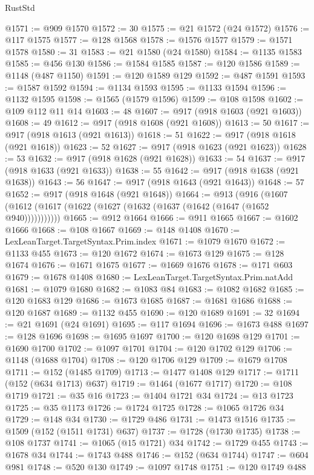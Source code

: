 \begin{lexlean}{RustStd}
\begin{coremodule}
@1571 := @909 @1570
@1572 := 30
@1575 := @21 @1572 (@24 @1572)
@1576 := @117 @1575
@1577 := @128 @1568
@1578 := @1576 @1577
@1579 := @1571 @1578
@1580 := 31
@1583 := @21 @1580 (@24 @1580)
@1584 := @1135 @1583
@1585 := @456 @130
@1586 := @1584 @1585
@1587 := @120 @1586
@1589 := @1148 (@487 @1150)
@1591 := @120 @1589 @129
@1592 := @487 @1591
@1593 := @1587 @1592
@1594 := @1134 @1593
@1595 := @1133 @1594
@1596 := @1132 @1595
@1598 := @1565 (@1579 @1596)
@1599 := @108 @1598
@1602 := @109 @112 @11 @14
@1603 := 48
@1607 := @917 (@918 @1603 (@921 @1603))
@1608 := 49
@1612 := @917 (@918 @1608 (@921 @1608))
@1613 := 50
@1617 := @917 (@918 @1613 (@921 @1613))
@1618 := 51
@1622 := @917 (@918 @1618 (@921 @1618))
@1623 := 52
@1627 := @917 (@918 @1623 (@921 @1623))
@1628 := 53
@1632 := @917 (@918 @1628 (@921 @1628))
@1633 := 54
@1637 := @917 (@918 @1633 (@921 @1633))
@1638 := 55
@1642 := @917 (@918 @1638 (@921 @1638))
@1643 := 56
@1647 := @917 (@918 @1643 (@921 @1643))
@1648 := 57
@1652 := @917 (@918 @1648 (@921 @1648))
@1664 := @913
    (@916 (@1607 (@1612 (@1617 (@1622 (@1627 (@1632 (@1637 (@1642 (@1647 (@1652 @940)))))))))))
@1665 := @912 @1664
@1666 := @911 @1665
@1667 := @1602 @1666
@1668 := @108 @1667
@1669 := @148 @1408
@1670 := LexLeanTarget.TargetSyntax.Prim.index
@1671 := @1079 @1670
@1672 := @1133 @455
@1673 := @120 @1672
@1674 := @1673 @129
@1675 := @128 @1674
@1676 := @1671 @1675
@1677 := @1669 @1676
@1678 := @171 @603
@1679 := @1678 @1408
@1680 := LexLeanTarget.TargetSyntax.Prim.natAdd
@1681 := @1079 @1680
@1682 := @1083 @84
@1683 := @1082 @1682
@1685 := @120 @1683 @129
@1686 := @1673 @1685
@1687 := @1681 @1686
@1688 := @120 @1687
@1689 := @1132 @455
@1690 := @120 @1689
@1691 := 32
@1694 := @21 @1691 (@24 @1691)
@1695 := @117 @1694
@1696 := @1673 @488
@1697 := @128 @1696
@1698 := @1695 @1697
@1700 := @120 @1698 @129
@1701 := @1690 @1700
@1702 := @1097 @1701
@1704 := @120 @1702 @129
@1706 := @1148 (@1688 @1704)
@1708 := @120 @1706 @129
@1709 := @1679 @1708
@1711 := @152 (@1485 @1709)
@1713 := @1477 @1408 @129
@1717 := @1711 (@152 (@634 @1713) @637)
@1719 := @1464 (@1677 @1717)
@1720 := @108 @1719
@1721 := @35 @16
@1723 := @1404 @1721 @34
@1724 := @13 @1723
@1725 := @35 @1173
@1726 := @1724 @1725
@1728 := @1065 @1726 @34
@1729 := @148 @34
@1730 := @1729 @486
@1731 := @1473 @1516
@1735 := @1509 (@152 (@1511 @1731) @637)
@1737 := @1728 (@1730 @1735)
@1738 := @108 @1737
@1741 := @1065 (@15 @1721) @34
@1742 := @1729 @455
@1743 := @1678 @34
@1744 := @1743 @488
@1746 := @152 (@634 @1744)
@1747 := @604 @981
@1748 := @520 @130
@1749 := @1097 @1748
@1751 := @120 @1749 @488

\end{coremodule}
\end{lexlean}
